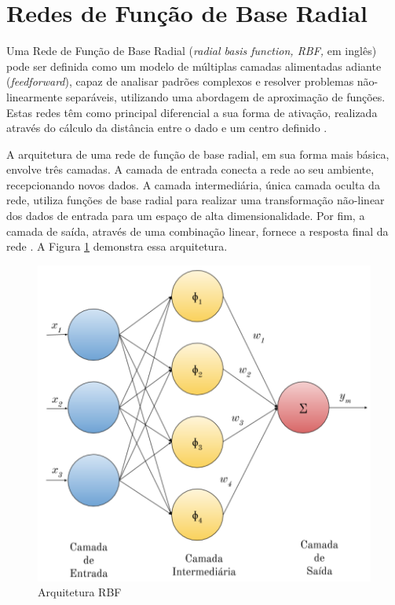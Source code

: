 \documentclass[qual, classic, a4paper]{ufbathesis}
\begin{document}
\section{Redes de Função de Base Radial}

Uma Rede de Função de Base Radial (\textit{radial basis function, RBF,} em inglês) pode ser definida como um modelo de múltiplas camadas alimentadas adiante (\textit{feedforward}), 
capaz de analisar padrões complexos e resolver problemas não-linearmente separáveis, utilizando uma abordagem de aproximação de funções.
Estas redes têm como principal diferencial a sua forma de ativação, realizada através do cálculo da distância entre o dado e um centro definido \cite{Braga:RedesNeuraisTeoriaAplicacoes}.

A arquitetura de uma rede de função de base radial, em sua forma mais básica, envolve três camadas.
A camada de entrada conecta a rede ao seu ambiente, recepcionando novos dados.
A camada intermediária, única camada oculta da rede, 
utiliza funções de base radial para realizar uma transformação não-linear dos dados de entrada para um espaço de alta dimensionalidade.
Por fim, a camada de saída, através de uma combinação linear, fornece a resposta final da rede \cite{Rojas:1996:NNS:235222}. 
A Figura \ref{fig:rbg_arq} demonstra essa arquitetura.

\begin{figure}[ht]
\begin{center}
    \includegraphics[scale=1]{imagens/rbf_arq.png}
    \caption{Arquitetura RBF}
    \label{fig:rbg_arq}
\end{center}
\end{figure}
\end{document}
